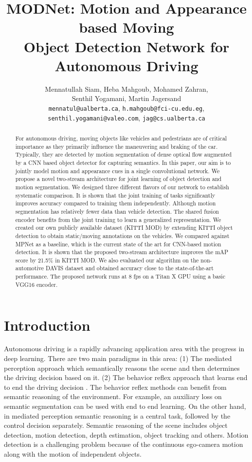 \documentclass[letterpaper, 10 pt, conference]{ieeeconf}  %
\title{MODNet: Motion and Appearance based Moving\\ Object Detection Network for Autonomous Driving}
\author{Mennatullah Siam, Heba Mahgoub, Mohamed Zahran,\\ Senthil Yogamani, Martin Jagersand\\
{\tt\small mennatul@ualberta.ca}, {\tt\small h.mahgoub@fci-cu.edu.eg},\\
{\tt\small senthil.yogamani@valeo.com},
{\tt\small jag@cs.ualberta.ca}
}
\begin{document}
\maketitle
\thispagestyle{empty}
\pagestyle{empty}


\begin{abstract}
For autonomous driving, moving objects like vehicles and pedestrians are of critical importance as they primarily influence the maneuvering and braking of the car. Typically, they are detected by motion segmentation of dense optical flow augmented by a CNN based object detector for capturing semantics. In this paper, our aim is to jointly model motion and appearance cues in a single convolutional network. We propose a novel two-stream architecture for joint learning of object detection and motion segmentation. We designed three different flavors of our network to establish systematic comparison. It is shown that the joint training of tasks significantly improves accuracy compared to training them independently. Although motion segmentation has relatively fewer data than vehicle detection. The shared fusion encoder benefits from the joint training to learn a generalized representation. We created our own publicly available dataset (KITTI MOD) by extending KITTI object detection to obtain static/moving annotations on the vehicles. We compared against MPNet as a baseline, which is the current state of the art for CNN-based motion detection. It is shown that the proposed two-stream architecture improves the mAP score by 21.5\% in KITTI MOD. We also evaluated our algorithm on the non-automotive DAVIS dataset and obtained accuracy close to the state-of-the-art performance. The proposed network runs at 8 fps on a Titan X GPU using a basic VGG16 encoder.



\end{abstract}

\section{Introduction}
Autonomous driving is a rapidly advancing application area with the progress in deep learning. There are two main paradigms in this area: (1) The mediated perception approach which semantically reasons the scene \cite{geiger20143d}\cite{teichmann2016multinet} and then determines the driving decision based on it. (2) The behavior reflex approach that learns end to end the driving decision \cite{bojarski2016end}\cite{xu2016end}. The behavior reflex methods can benefit from semantic reasoning of the environment. For example, an auxiliary loss on semantic segmentation \cite{xu2016end} can be used with end to end learning. On the other hand, in mediated perception semantic reasoning is a central task, followed by the control decision separately. Semantic reasoning of the scene includes object detection, motion detection, depth estimation, object tracking and others. Motion detection is a challenging problem because of the continuous ego-camera motion along with the motion of independent objects. 
\end{document}
